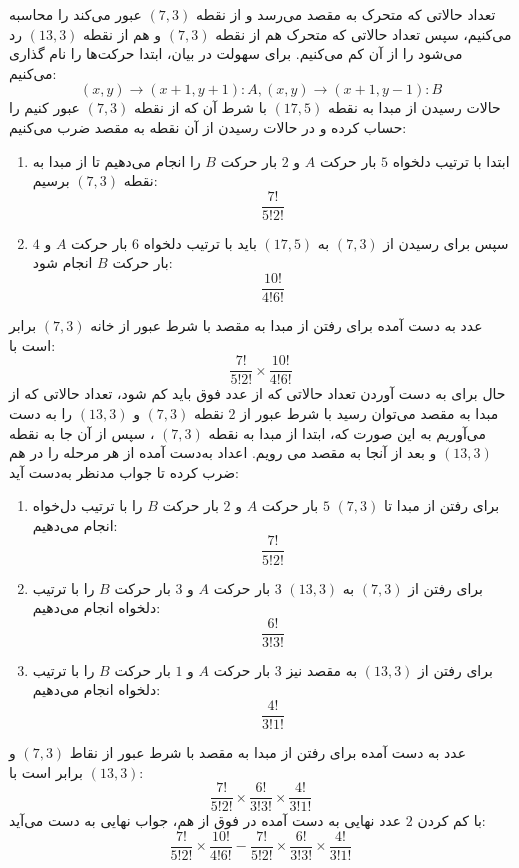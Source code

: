 \p
تعداد حالاتی که متحرک به مقصد می‌رسد و از نقطه 
$(7, 3)$ 
عبور می‌کند را محاسبه می‌کنیم، سپس تعداد حالاتی که متحرک هم از نقطه
$(7, 3)$ 
و هم از نقطه 
$(13, 3)$ 
رد می‌شود را از آن کم می‌کنیم. برای سهولت در بیان، ابتدا حرکت‌ها را نام گذاری می‌کنیم:
$$(x ,y) \to (x + 1, y + 1) : A , (x, y) \to (x + 1, y - 1) : B$$
   حالات رسیدن از مبدا به نقطه
$(17, 5)$
     با شرط آن که از نقطه
$(7, 3)$
      عبور کنیم را حساب کرده و در حالات رسیدن از آن نقطه به مقصد ضرب می‌کنیم:
    \begin{enumerate}
        \item 
        ابتدا با ترتیب دلخواه 
$5$ 
         بار حرکت 
$A$
          و
$2$ 
          بار حرکت 
$B$
           را انجام می‌دهیم تا از مبدا به نقطه 
$(7,3)$
           برسیم:
$$\frac{7!}{5!2!}$$
        \item
        سپس برای رسیدن از 
$(7, 3)$
         به 
$(17,5)$ 
        باید با ترتیب دلخواه
$6$ 
        بار حرکت 
$A$ 
        و 
$4$ 
        بار حرکت
$B$ 
        انجام شود:
$$\frac{10!}{4!6!}$$
    \end{enumerate}
    عدد به دست آمده برای رفتن از مبدا به مقصد با شرط عبور از خانه
$(7, 3)$ 
     برابر است با:
$$\frac{7!}{5!2!}\times\frac{10!}{4!6!}$$
    حال برای به دست آوردن تعداد حالاتی که از عدد فوق باید کم شود، تعداد حالاتی که از مبدا به مقصد می‌توان رسید با شرط عبور از
$2$ 
    نقطه
$(7, 3)$ 
    و
$(13, 3)$ 
     را به دست می‌آوریم به این صورت که، ابتدا از مبدا به نقطه
$(7, 3)$ 
، سپس از آن جا به نقطه
$(13, 3)$ 
     و بعد از آنجا به مقصد می رویم. اعداد به‌دست آمده از هر مرحله را در هم ضرب کرده تا جواب مدنظر به‌دست آید:
    \begin{enumerate}
        \item 
        برای رفتن از مبدا تا 
$(7, 3)$
$5$
          بار حرکت
$A$ 
           و
$2$ 
            بار حرکت
$B$ 
            را با ترتیب دل‌خواه انجام می‌دهیم:
$$\frac{7!}{5!2!}$$
        \item
        برای رفتن از 
$(7, 3)$ 
        به 
$(13, 3)$
$3$
          بار حرکت 
$A$ 
          و
$3$
           بار حرکت
$B$
            را با ترتیب دلخواه انجام می‌دهیم:
$$\frac{6!}{3!3!}$$
        \item
        برای رفتن از
$(13, 3)$
         به مقصد نیز 
$3$ 
         بار حرکت
$A$
         و
$1$ 
          بار حرکت
$B$
            را با ترتیب دلخواه انجام می‌دهیم: 
$$\frac{4!}{3!1!}$$
    \end{enumerate}
    عدد به دست آمده برای رفتن از مبدا به مقصد با شرط عبور از نقاط 
$(7, 3)$ 
    و 
$(13, 3)$ 
    برابر است با:
$$\frac{7!}{5!2!}\times\frac{6!}{3!3!}\times\frac{4!}{3!1!}$$
    با کم کردن 
$2$ 
    عدد نهایی به دست آمده در فوق از هم، جواب نهایی به دست می‌آید:
    $$\frac{7!}{5!2!}\times\frac{10!}{4!6!} - \frac{7!}{5!2!}\times\frac{6!}{3!3!}\times\frac{4!}{3!1!}$$